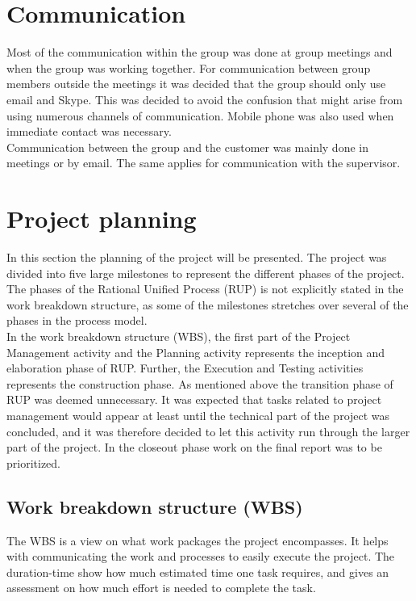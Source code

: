 \section{Communication}
Most of the communication within the group was done at group meetings and when the group was working together. For communication between group members outside the meetings it was decided that the group should only use email and Skype. This was decided to avoid the confusion that might arise from using numerous channels of communication. Mobile phone was also used when immediate contact was necessary.\\
\newline
Communication between the group and the customer was mainly done in meetings or by email. The same applies for communication with the supervisor.

\section{Project planning}
In this section the planning of the project will be presented. The project was divided into five large milestones to represent the different phases of the project. The phases of the Rational Unified Process (RUP) is not explicitly stated in the work breakdown structure, as some of the milestones stretches over several of the phases in the process model. \\
\newline
In the work breakdown structure (WBS), the first part of the Project Management activity and the Planning activity represents the inception and elaboration phase of RUP. Further, the Execution and Testing activities represents the construction phase. As mentioned above the transition phase of RUP was deemed unnecessary. It was expected that tasks related to project management would appear at least until the technical part of the project was concluded, and it was therefore decided to let this activity run through the larger part of the project. In the closeout phase work on the final report was to be prioritized.

\subsection{Work breakdown structure (WBS)}
The WBS is a view on what work packages the project encompasses. It helps with communicating the work and processes to easily execute the project. The duration-time show how much estimated time one task requires, and gives an assessment on how much effort is needed to complete the task.

